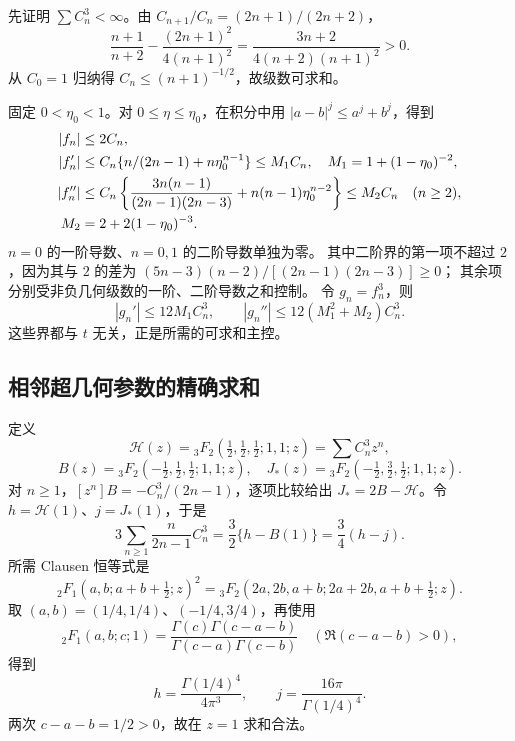 \documentclass[11pt,a4paper]{article}
\numberwithin{equation}{section}
\theoremstyle{remark}\newtheorem{remark}[theorem]{说明}
\newcommand{\HH}{\mathscr H}
\begin{document}
先证明 $\sum C_n^3<\infty$。由 $C_{n+1}/C_n=(2n+1)/(2n+2)$，
\[
 \frac{n+1}{n+2}-\frac{(2n+1)^2}{4(n+1)^2}
 =\frac{3n+2}{4(n+2)(n+1)^2}>0.
\]
从 $C_0=1$ 归纳得 $C_n\le(n+1)^{-1/2}$，故级数可求和。

固定 $0<\eta_0<1$。对 $0\le\eta\le\eta_0$，在积分中用
$|a-b|^j\le a^j+b^j$，得到
\begin{align}
 |f_n|&\le2C_n,\notag\\
 |f_n'|&\le C_n\{n/(2n-1)+n\eta_0^{n-1}\}\le M_1C_n,
 \quad M_1=1+(1-\eta_0)^{-2},\label{eq:majorants}\\
 |f_n''|&\le C_n\left\{\frac{3n(n-1)}{(2n-1)(2n-3)}
                 +n(n-1)\eta_0^{n-2}\right\}\le M_2C_n\quad(n\ge2),\notag\\
 M_2&=2+2(1-\eta_0)^{-3}.\notag
\end{align}
$n=0$ 的一阶导数、$n=0,1$ 的二阶导数单独为零。
其中二阶界的第一项不超过 $2$，因为其与 $2$ 的差为
$(5n-3)(n-2)/[(2n-1)(2n-3)]\ge0$；
其余项分别受非负几何级数的一阶、二阶导数之和控制。
令 $g_n=f_n^3$，则
\begin{equation}\label{eq:gmajorants}
 |g_n'|\le12M_1C_n^3,\qquad
 |g_n''|\le12(M_1^2+M_2)C_n^3.
\end{equation}
这些界都与 $t$ 无关，正是所需的可求和主控。

\subsection{相邻超几何参数的精确求和}
定义
\[
 \HH(z)={}_3F_2(\tfrac12,\tfrac12,\tfrac12;1,1;z)=\sum C_n^3z^n,
\]
\[
 B(z)={}_3F_2(-\tfrac12,\tfrac12,\tfrac12;1,1;z),\quad
 J_*(z)={}_3F_2(-\tfrac12,\tfrac32,\tfrac12;1,1;z).
\]
对 $n\ge1$，$[z^n]B=-C_n^3/(2n-1)$，逐项比较给出
$J_*=2B-\HH$。令 $h=\HH(1)$、$j=J_*(1)$，于是
\begin{equation}\label{eq:contiguous}
 3\sum_{n\ge1}\frac{n}{2n-1}C_n^3=\frac32\{h-B(1)\}=\frac34(h-j).
\end{equation}
所需 Clausen 恒等式是
\[
 {}_2F_1(a,b;a+b+\tfrac12;z)^2
 ={}_3F_2(2a,2b,a+b;2a+2b,a+b+\tfrac12;z).
\]
取 $(a,b)=(1/4,1/4)$、$(-1/4,3/4)$，再使用
\[
 {}_2F_1(a,b;c;1)=\frac{\Gamma(c)\Gamma(c-a-b)}{\Gamma(c-a)\Gamma(c-b)}
 \quad(\Re(c-a-b)>0),
\]
得到
\begin{equation}\label{eq:hj}
 h=\frac{\Gamma(1/4)^4}{4\pi^3},\qquad
 j=\frac{16\pi}{\Gamma(1/4)^4}.
\end{equation}
两次 $c-a-b=1/2>0$，故在 $z=1$ 求和合法。
\end{document}
